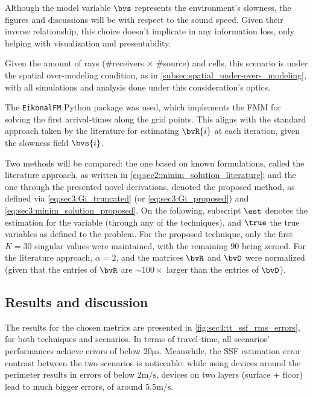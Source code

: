 

%

Although the model variable $\bvs$ represents the environment's slowness, the figures and discussions will be with respect to the sound speed. Given their inverse relationship, this choice doesn't implicate in any information loss, only helping with visualization and presentability.

Given the amount of rays (\#receivers $\times$ \#source) and cells, this scenario is under the spatial over-modeling condition, as in \cref{subsec:spatial_under-over-_modeling}, with all simulations and analysis done under this consideration's optics.

The \texttt{EikonalFM} Python package \cite{ganster_eikonalfm_2025} was used, which implements the FMM \cite{sethian_fast_1999,chopp_improvements_2001} for solving the first arrival-times along the grid points. This aligns with the standard approach taken by the literature for estimating $\bvR{i}$ at each iteration, given the slowness field $\bvs{i}$.

Two methods will be compared: the one based on known formulations, called the literature approach, as written in \cref{eq:sec2:minim_solution_literature}; and the one through the presented novel derivations, denoted the proposed method, as defined via \cref{eq:sec3:Gi_truncated} (or \cref{eq:sec3:Gi_proposed}) and \cref{eq:sec3:minim_solution_proposed}. On the following, subscript $\est$ denotes the estimation for the variable (through any of the techniques), and $\true$ the true variables as defined to the problem. For the proposed technique, only the first $K=30$ singular values were maintained, with the remaining $90$ being zeroed. For the literature approach, $\alpha = 2$, and the matrices $\bvR$ and $\bvD$ were normalized (given that the entries of $\bvR$ are $\sim100\times$ larger than the entries of $\bvD$).



\subsection{Results and discussion}

The results for the chosen metrics are presented in \cref{fig:sec4:tt_ssf_rms_errors}, for both techniques and scenarios. In terms of travel-time, all scenarios' performances achieve errors of below $20\si{\micro\second}$. Meanwhile, the SSF estimation error contrast between the two scenarios is noticeable: while using devices around the perimeter results in errors of below $2\si{\meter/\second}$, devices on two layers (surface + floor) lead to much bigger errors, of around $5.5\si{\meter/\second}$.

